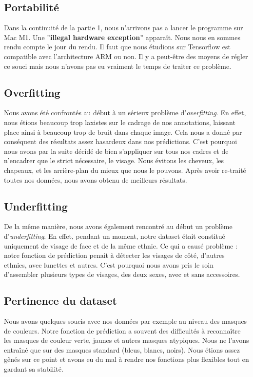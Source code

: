 \documentclass{rapport}
\begin{document}
        \subsection{Portabilité}
        Dans la continuité de la partie 1, nous n'arrivons pas a lancer le programme sur Mac M1. Une \textbf{"illegal hardware exception"} apparaît. Nous nous en sommes rendu compte le jour du rendu. Il faut que nous étudions sur Tensorflow est compatible avec l'architecture ARM ou non. Il y a peut-être des moyens de régler ce souci mais nous n'avons pas eu vraiment le temps de traiter ce problème.
        
        \subsection{Overfitting}
        Nous avons été confrontés au début à un sérieux problème d'\textit{overfitting}. En effet, nous étions beaucoup trop laxistes sur le cadrage de nos annotations, laissant place ainsi à beaucoup trop de bruit dans chaque image. Cela nous a donné par conséquent des résultats assez hasardeux dans nos prédictions. C'est pourquoi nous avons par la suite décidé de bien s'appliquer sur tous nos cadres et de n'encadrer que le strict nécessaire, le visage. Nous évitons les cheveux, les chapeaux, et les arrière-plan du mieux que nous le pouvons. Après avoir re-traité toutes nos données, nous avons obtenu de meilleurs résultats.
        
        \subsection{Underfitting}
        De la même manière, nous avons également rencontré au début un problème d'\textit{underfitting}. En effet, pendant un moment, notre dataset était constitué uniquement de visage de face et de la même ethnie. Ce qui a causé problème : notre fonction de prédiction penait à détecter les visages de côté, d'autres ethnies, avec lunettes et autres. C'est pourquoi nous avons pris le soin d'assembler plusieurs types de visages, des deux sexes, avec et sans accessoires.
        
        \subsection{Pertinence du dataset}
        Nous avons quelques soucis avec nos données par exemple au niveau des masques de couleurs. Notre fonction de prédiction a souvent des difficultés à reconnaître les masques de couleur verte, jaunes et autres masques atypiques. Nous ne l'avons entraîné que sur des masques standard (bleus, blancs, noirs). Nous étions assez gênés sur ce point et avons eu du mal à rendre nos fonctions plus flexibles tout en gardant sa stabilité. 
\end{document}
